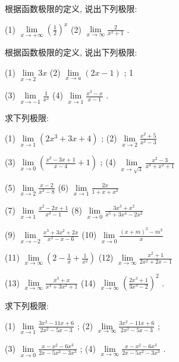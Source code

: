 \documentclass[lang=cn,newtx,10pt,scheme=chinese]{elegantbook}
\begin{document}
\begin{problemset}[习 题 二]

\item 根据函数极限的定义, 说出下列极限:

(1) \(\mathop{\lim }\limits_{{x \rightarrow + \infty }}{\left( \frac{1}{2}\right) }^{x}\) (2) \(\mathop{\lim }\limits_{{x \rightarrow \infty }}\frac{2}{{x}^{2} + 1}\) .

\item 根据函数极限的定义, 说出下列极限:

(1) \(\mathop{\lim }\limits_{{x \rightarrow 2}}{3x}\) (2) \(\mathop{\lim }\limits_{{x \rightarrow a}}\left( {{2x} - 1}\right)\) ; 1

(3) \(\mathop{\lim }\limits_{{x \rightarrow - 1}}\frac{1}{{x}^{2}}\) (4) \(\mathop{\lim }\limits_{{x \rightarrow 1}}\frac{{x}^{3} - x}{x - 1}\) .

\item 求下列极限:

(1) \(\mathop{\lim }\limits_{{x \rightarrow 1}}\left( {2{x}^{3} + {3x} + 4}\right)\) ; (2) \(\mathop{\lim }\limits_{{x \rightarrow 2}}\frac{{x}^{2} + 5}{{x}^{2} - 3}\)

(3) \(\mathop{\lim }\limits_{{x \rightarrow 0}}\left( {\frac{{x}^{2} - {3x} + 1}{x - 4} + 1}\right)\) ; (4) \(\mathop{\lim }\limits_{{x \rightarrow \sqrt{3}}}\frac{{x}^{2} - 3}{{x}^{4} + {x}^{2} + 1}\)

(5) \(\mathop{\lim }\limits_{{x \rightarrow 2}}\frac{x - 2}{{x}^{3} - 8}\) (6) \(\mathop{\lim }\limits_{{x \rightarrow 1}}\frac{2x}{1 + x + {x}^{2}}\)

(7) \(\mathop{\lim }\limits_{{x \rightarrow 1}}\frac{{x}^{2} - {2x} + 1}{{x}^{3} - 1}\) (8) \(\mathop{\lim }\limits_{{x \rightarrow 0}}\frac{3{x}^{3} + {x}^{2}}{{x}^{5} + 3{x}^{4} - 2{x}^{2}}\)

(9) \(\mathop{\lim }\limits_{{x \rightarrow - 2}}\frac{{x}^{3} + 3{x}^{2} + {2x}}{{x}^{2} - x - 6}\) (10) \(\mathop{\lim }\limits_{{x \rightarrow 0}}\frac{{\left( x + m\right) }^{3} - {m}^{3}}{x}\)

(11) \(\mathop{\lim }\limits_{{x \rightarrow \infty }}\left( {2 - \frac{1}{x} + \frac{1}{{x}^{2}}}\right)\) (12) \(\mathop{\lim }\limits_{{x \rightarrow \infty }}\frac{{x}^{2} + 1}{2{x}^{2} + {2x} - 1}\)

(13) \(\mathop{\lim }\limits_{{x \rightarrow \infty }}\frac{{x}^{3} + x}{{x}^{4} + 3{x}^{2} + 1}\) (14) \(\mathop{\lim }\limits_{{x \rightarrow \infty }}{\left( \frac{2{x}^{3} + 1}{3{x}^{3} - 2}\right) }^{2}\) .

\item 求下列极限:

(1) \(\mathop{\lim }\limits_{{x \rightarrow 1}}\frac{3{x}^{2} - {11x} + 6}{2{x}^{2} - {5x} - 3}\) ; (2) \(\mathop{\lim }\limits_{{x \rightarrow \infty }}\frac{3{x}^{2} - {11x} + 6}{2{x}^{2} - {5x} - 3}\) ;

(3) \(\mathop{\lim }\limits_{{x \rightarrow 0}}\frac{x - {x}^{2} - 6{x}^{3}}{{2x} - 5{x}^{2} - 3{x}^{3}}\) ; (4) \(\mathop{\lim }\limits_{{x \rightarrow \infty }}\frac{x - {x}^{2} - 6{x}^{3}}{{2x} - 5{x}^{2} - 3{x}^{3}}\) .
\end{problemset}
\end{document}
